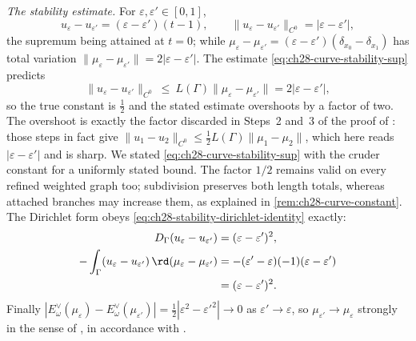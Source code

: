 \begin{example}
\emph{The stability estimate.}  For
\(\varepsilon,\varepsilon'\in[0,1]\),
\[
 u_\varepsilon-u_{\varepsilon'}
 =(\varepsilon-\varepsilon')(t-1),
 \qquad
 \lVert u_\varepsilon-u_{\varepsilon'}\rVert_{C^0}
 =|\varepsilon-\varepsilon'| ,
\]
the supremum being attained at \(t=0\); while
\(\mu_\varepsilon-\mu_{\varepsilon'}
=(\varepsilon-\varepsilon')(\delta_{x_0}-\delta_{x_1})\) has total variation
\(\lVert\mu_\varepsilon-\mu_{\varepsilon'}\rVert
=2|\varepsilon-\varepsilon'|\).  The estimate
\eqref{eq:ch28-curve-stability-sup} predicts
\[
 \lVert u_\varepsilon-u_{\varepsilon'}\rVert_{C^0}
 \ \leq\ L(\Gamma)\lVert\mu_\varepsilon-\mu_{\varepsilon'}\rVert
 =2|\varepsilon-\varepsilon'| ,
\]
so the true constant is \(\tfrac12\) and the stated estimate overshoots by a
factor of two.  The overshoot is exactly the factor discarded in Steps~2
and~3 of the proof of : those steps in fact
give \(\lVert u_1-u_2\rVert_{C^0}\leq\tfrac12L(\Gamma)
\lVert\mu_1-\mu_2\rVert\), which here reads
\(|\varepsilon-\varepsilon'|\) and is sharp.  We stated
\eqref{eq:ch28-curve-stability-sup} with the cruder constant for a
uniformly stated bound.  The factor \(1/2\) remains valid on every
refined weighted graph too; subdivision preserves both length totals,
whereas attached branches may increase them, as explained in
\cref{rem:ch28-curve-constant}.  The Dirichlet form obeys
\eqref{eq:ch28-stability-dirichlet-identity} exactly:
\[
 \begin{aligned}
 D_\Gamma(u_\varepsilon-u_{\varepsilon'})
 &=(\varepsilon-\varepsilon')^2,\\
 -\int_\Gamma(u_\varepsilon-u_{\varepsilon'})\,
  \rd(\mu_\varepsilon-\mu_{\varepsilon'})
 &=-(\varepsilon'-\varepsilon)(-1)(\varepsilon-\varepsilon')\\
 &=(\varepsilon-\varepsilon')^2 .
 \end{aligned}
\]
Finally
\(|E^\vee_\omega(\mu_\varepsilon)-E^\vee_\omega(\mu_{\varepsilon'})|
=\tfrac12|\varepsilon^2-\varepsilon'^2|\to0\) as
\(\varepsilon'\to\varepsilon\), so \(\mu_{\varepsilon'}\to\mu_\varepsilon\)
strongly in the sense of , in
accordance with .


\end{example}
